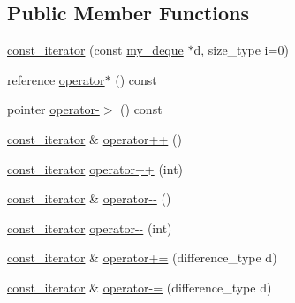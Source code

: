 \subsection*{Public Member Functions}
\begin{DoxyCompactItemize}
\item 
\hyperlink{classmy__deque_1_1const__iterator_a5277fb9ed18b511d89077834e3564f3c}{const\-\_\-iterator} (const \hyperlink{classmy__deque}{my\-\_\-deque} $\ast$d, size\-\_\-type i=0)
\item 
reference \hyperlink{classmy__deque_1_1const__iterator_a14715989004b54dc6a1bcd3d2ac78a20}{operator$\ast$} () const 
\item 
pointer \hyperlink{classmy__deque_1_1const__iterator_aef7e08cfcebb0c0932422f420645e1ce}{operator-\/$>$} () const 
\item 
\hyperlink{classmy__deque_1_1const__iterator}{const\-\_\-iterator} \& \hyperlink{classmy__deque_1_1const__iterator_a8bc45a394bb73728fca1ebf90755d662}{operator++} ()
\item 
\hyperlink{classmy__deque_1_1const__iterator}{const\-\_\-iterator} \hyperlink{classmy__deque_1_1const__iterator_adf9ea902391ac993088e7c969c64e4de}{operator++} (int)
\item 
\hyperlink{classmy__deque_1_1const__iterator}{const\-\_\-iterator} \& \hyperlink{classmy__deque_1_1const__iterator_ae5dffda4ac0a8ad59a4954dcdeeb5f98}{operator-\/-\/} ()
\item 
\hyperlink{classmy__deque_1_1const__iterator}{const\-\_\-iterator} \hyperlink{classmy__deque_1_1const__iterator_a83c405a1e0b9672c074aaa933a7127df}{operator-\/-\/} (int)
\item 
\hyperlink{classmy__deque_1_1const__iterator}{const\-\_\-iterator} \& \hyperlink{classmy__deque_1_1const__iterator_a2bbc121cc446855edcb9d20451cae024}{operator+=} (difference\-\_\-type d)
\item 
\hyperlink{classmy__deque_1_1const__iterator}{const\-\_\-iterator} \& \hyperlink{classmy__deque_1_1const__iterator_ab51576a76fd33fd55be87ca4c467dc96}{operator-\/=} (difference\-\_\-type d)
\end{DoxyCompactItemize}
